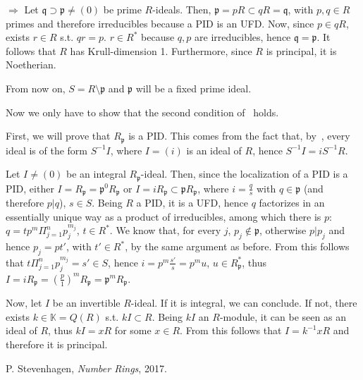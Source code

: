 \documentclass{article}
\newcommand{\numberset}{\mathbb}
\newcommand{\K}{\numberset{K}}
\newcommand{\pid}{\mathfrak{p}}
\newcommand{\qid}{\mathfrak{q}}
\begin{document}
$\Rightarrow$ Let $\qid\supset\pid\neq (0)$ be prime $R$-ideals. Then, $\pid=pR\subset qR=\qid$, with $p,q\in R$ primes and therefore irreducibles because a PID is an UFD. Now, since $p\in qR$, exists $r\in R$ s.t. $qr=p$. $r\in R^*$ because $q,p$ are irreducibles, hence $\qid=\pid$. It follows that $R$ has Krull-dimension 1. Furthermore, since $R$ is principal, it is Noetherian.

From now on, $S=R\setminus\pid$ and $\pid$ will be a fixed prime ideal.

Now we only have to show that the second condition of~\cite[theorem 2.17]{stev} holds.

First, we will prove that $R_{\pid}$ is a PID. This comes from the fact that, by~\cite[prop. 2.8]{stev}, every ideal is of the form $S^{-1}I$, where $I=(i)$ is an ideal of $R$, hence $S^{-1}I=iS^{-1}R$.

Let $I\neq (0)$ be an integral $R_{\pid}$-ideal. Then, since the localization of a PID is a PID, either $I=R_{\pid}=\pid^0R_{\pid}$ or $I=iR_{\pid}\subset\pid R_{\pid}$, where $i=\frac{q}{s}$ with $q\in\pid$ (and therefore $p|q$), $s\in S$. Being $R$ a PID, it is a UFD, hence $q$ factorizes in an essentially unique way as a product of irreducibles, among which there is $p$: $q=tp^m\Pi_{j=1}^n p_j^{m_j}$, $t\in R^*$. We know that, for every $j$, $p_j\not\in\pid$, otherwise $p|p_j$ and hence $p_j=pt'$, with $t'\in R^*$, by the same argument as before. From this follows that $t\Pi_{j=1}^n p_j^{m_j}=s'\in S$, hence $i=p^m\frac{s'}{s}=p^mu$, $u\in R_{\pid}^*$, thus $I=iR_{\pid}=(\frac{p}{1})^mR_{\pid}=\pid^mR_{\pid}$.

Now, let $I$ be an invertible $R$-ideal. If it is integral, we can conclude. If not, there exists $k\in\K=Q(R)$ s.t. $kI\subset R$. Being $kI$ an $R$-module, it can be seen as an ideal of $R$, thus $kI=xR$ for some $x\in R$. From this follows that $I=k^{-1}xR$ and therefore it is principal.


\begin{thebibliography}{9}
				P. Stevenhagen,
				\textit{Number Rings},
				2017.
\end{thebibliography}
\end{document}
